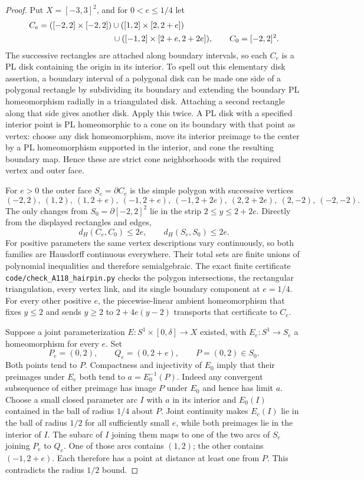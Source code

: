 \begin{proof}
Put $X=[-3,3]^2$, and for $0<e\leq1/4$ let
\begin{align*}
 C_e={}&([-2,2]\times[-2,2])\cup([1,2]\times[2,2+e])\\
       &\hspace{27mm}\cup([-1,2]\times[2+e,2+2e]),
 \qquad C_0=[-2,2]^2.
\end{align*}
The successive rectangles are attached along boundary intervals, so
each $C_e$ is a PL disk containing the origin in its interior. To spell
out this elementary disk assertion, a boundary interval of a polygonal
disk can be made one side of a polygonal rectangle by subdividing its
boundary and extending the boundary PL homeomorphism radially in a
triangulated disk. Attaching a second rectangle along that side gives
another disk. Apply this twice. A PL disk with a specified interior
point is PL homeomorphic to a cone on its boundary with that point as
vertex: choose any disk homeomorphism, move its interior preimage to
the center by a PL homeomorphism supported in the interior, and cone
the resulting boundary map. Hence these are strict cone neighborhoods
with the required vertex and outer face.

For $e>0$ the outer face $S_e=\partial C_e$ is the simple polygon with
successive vertices
\[
 (-2,2),\ (1,2),\ (1,2+e),\ (-1,2+e),\
 (-1,2+2e),\ (2,2+2e),\ (2,-2),\ (-2,-2).
\]
The only changes from $S_0=\partial[-2,2]^2$ lie in the strip
$2\leq y\leq2+2e$. Directly from the displayed rectangles and edges,
\[
 d_H(C_e,C_0)\leq2e,\qquad d_H(S_e,S_0)\leq2e.
\]
For positive parameters the same vertex descriptions vary continuously,
so both families are Hausdorff continuous everywhere. Their total
sets are finite unions of polynomial inequalities and therefore
semialgebraic. The exact finite certificate
\texttt{code/check\_A118\_hairpin.py} checks the polygon intersections,
the rectangular triangulation, every vertex link, and its single
boundary component at $e=1/4$. For every other positive $e$, the
piecewise-linear ambient homeomorphism that fixes $y\leq2$ and sends
$y\geq2$ to $2+4e(y-2)$ transports that certificate to $C_e$.

Suppose a joint parameterization
$E:S^1\times[0,\delta]\to X$ existed, with $E_e:S^1\to S_e$ a
homeomorphism for every $e$. Set
\[
 P_e=(0,2),\qquad Q_e=(0,2+e),\qquad P=(0,2)\in S_0.
\]
Both points tend to $P$. Compactness and injectivity of $E_0$ imply
that their preimages under $E_e$ both tend to
$a=E_0^{-1}(P)$. Indeed any convergent subsequence of either preimage
has image $P$ under $E_0$ and hence has limit $a$.
Choose a small closed parameter arc $I$ with $a$ in its interior
and $E_0(I)$ contained in the ball of radius $1/4$ about $P$.
Joint continuity makes $E_e(I)$ lie in the ball of radius $1/2$
for all sufficiently small $e$, while both preimages lie in the
interior of $I$. The subarc of $I$ joining them maps to one of the
two arcs of $S_e$ joining $P_e$ to $Q_e$. One of those arcs contains
$(1,2)$; the other contains $(-1,2+e)$. Each therefore has a point
at distance at least one from $P$. This contradicts the radius
$1/2$ bound.


\end{proof}
